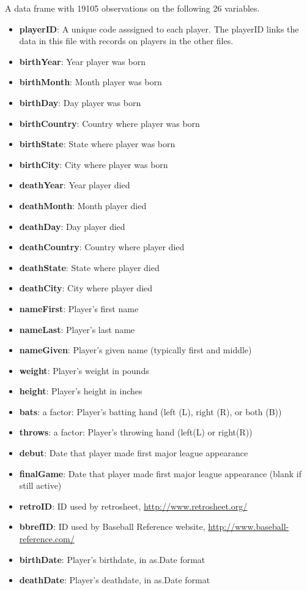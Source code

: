 \documentclass[]{book}
\providecommand{\tightlist}{%
  \setlength{\itemsep}{0pt}\setlength{\parskip}{0pt}}
\theoremstyle{definition}
\theoremstyle{definition}
\theoremstyle{definition}
\theoremstyle{remark}
\begin{document}
A data frame with 19105 observations on the following 26 variables.

\begin{itemize}
\tightlist
\item
  \textbf{playerID}: A unique code asssigned to each player. The
  playerID links the data in this file with records on players in the
  other files.
\item
  \textbf{birthYear}: Year player was born
\item
  \textbf{birthMonth}: Month player was born
\item
  \textbf{birthDay}: Day player was born
\item
  \textbf{birthCountry}: Country where player was born
\item
  \textbf{birthState}: State where player was born
\item
  \textbf{birthCity}: City where player was born
\item
  \textbf{deathYear}: Year player died
\item
  \textbf{deathMonth}: Month player died
\item
  \textbf{deathDay}: Day player died
\item
  \textbf{deathCountry}: Country where player died
\item
  \textbf{deathState}: State where player died
\item
  \textbf{deathCity}: City where player died
\item
  \textbf{nameFirst}: Player's first name
\item
  \textbf{nameLast}: Player's last name
\item
  \textbf{nameGiven}: Player's given name (typically first and middle)
\item
  \textbf{weight}: Player's weight in pounds
\item
  \textbf{height}: Player's height in inches
\item
  \textbf{bats}: a factor: Player's batting hand (left (L), right (R),
  or both (B))
\item
  \textbf{throws}: a factor: Player's throwing hand (left(L) or
  right(R))
\item
  \textbf{debut}: Date that player made first major league appearance
\item
  \textbf{finalGame}: Date that player made first major league
  appearance (blank if still active)
\item
  \textbf{retroID}: ID used by retrosheet,
  \url{http://www.retrosheet.org/}
\item
  \textbf{bbrefID}: ID used by Baseball Reference website,
  \url{http://www.baseball-reference.com/}
\item
  \textbf{birthDate}: Player's birthdate, in as.Date format
\item
  \textbf{deathDate}: Player's deathdate, in as.Date format
\end{itemize}
\end{document}
